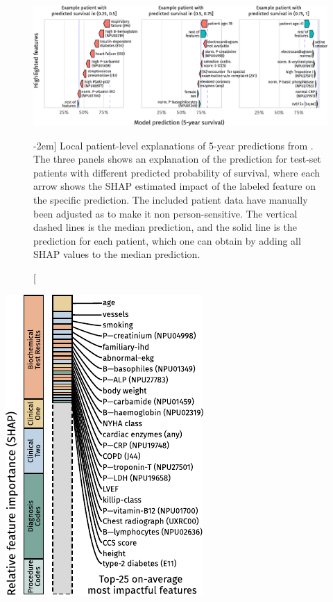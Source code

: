 \begin{figure}[t]
    \includegraphics[trim=8mm 5mm 4mm 0]{graphics/pmhnet-v1-shap-individual.pdf}
    \caption[Patient-level \acs{SHAP} Explanations][-2em]{%
        Local patient-level  explanations of 
        5-year predictions from . The three panels shows
        an explanation of the  prediction for test-set patients
        with different predicted probability of survival, where 
        each arrow shows the \ac{SHAP} estimated impact of the labeled
        feature on the specific prediction.
        The included patient data have manually been adjusted as to 
        make it non person-sensitive. 
        The vertical dashed lines is the median prediction, and 
        the solid line is the prediction for each patient, which 
        one can obtain by adding all \ac{SHAP} values to the 
        median prediction.}
    \label{fig:shap-individual}
\end{figure}%

\begin{marginfigure}[-5em]
    \includegraphics[trim=0 0 0 0]{graphics/pmhnet-v1-feature-impact.pdf}
    \caption[Overview of Average \acs{SHAP} Impact]{%
        By summarising the magnitude of  values, we obtained
        an overview of the relative impact of the different  features,
        either aggregated across feature categories (left) or 
        across each individual features (right). 
    }
    \label{fig:shap-overview}
\end{marginfigure}%

